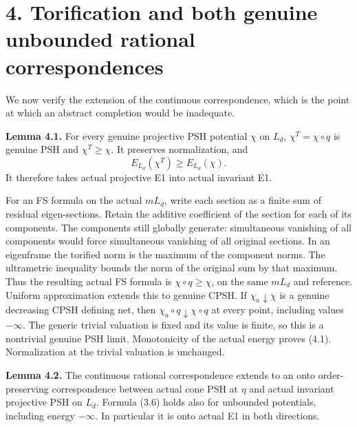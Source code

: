 \documentclass[
  10pt,
]{article}
\begin{document}
\section{4. Torification and both genuine unbounded rational
correspondences}\label{torification-and-both-genuine-unbounded-rational-correspondences}

We now verify the extension of the continuous correspondence, which is
the point at which an abstract completion would be inadequate.

\textbf{Lemma 4.1.} For every genuine projective PSH potential \(\chi\)
on \(L_d\), \(\chi^T=\chi\circ q\) is genuine PSH and
\(\chi^T\geq\chi\). It preserves normalization, and \[
                  E_{L_d}(\chi^T)\geq E_{L_d}(\chi).             \tag{4.1}
\] It therefore takes actual projective E1 into actual invariant E1.

For an FS formula on the actual \(mL_d\), write each section as a finite
sum of residual eigen-sections. Retain the additive coefficient of the
section for each of its components. The components still globally
generate: simultaneous vanishing of all components would force
simultaneous vanishing of all original sections. In an eigenframe the
torified norm is the maximum of the component norms. The ultrametric
inequality bounds the norm of the original sum by that maximum. Thus the
resulting actual FS formula is \(\chi\circ q\geq\chi\), on the same
\(mL_d\) and reference. Uniform approximation extends this to genuine
CPSH. If \(\chi_a\downarrow\chi\) is a genuine decreasing CPSH defining
net, then \(\chi_a\circ q\downarrow\chi\circ q\) at every point,
including values \(-\infty\). The generic trivial valuation is fixed and
its value is finite, so this is a nontrivial genuine PSH limit.
Monotonicity of the actual energy proves (4.1). Normalization at the
trivial valuation is unchanged.

\textbf{Lemma 4.2.} The continuous rational correspondence extends to an
onto order-preserving correspondence between actual cone PSH at \(\eta\)
and actual invariant projective PSH on \(L_d\). Formula (3.6) holds also
for unbounded potentials, including energy \(-\infty\). In particular it
is onto actual E1 in both directions.
\end{document}
